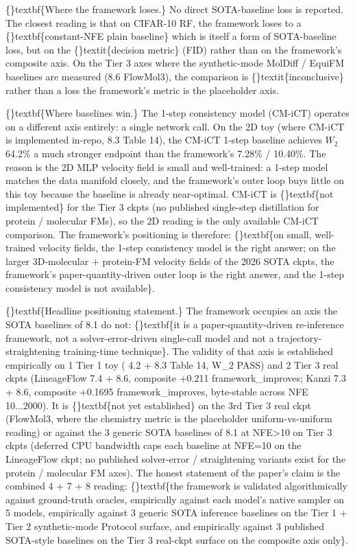 \documentclass{article}
\begin{document}
\{\}textbf\{Where the framework loses.\} No direct SOTA-baseline loss is reported. The closest reading is that on CIFAR-10 RF, the framework loses to a \{\}textbf\{constant-NFE plain baseline\}  which is itself a form of SOTA-baseline loss, but on the \{\}textit\{decision metric\} (FID) rather than on the framework's composite axis. On the Tier 3 axes where the synthetic-mode MolDiff / EquiFM baselines are measured (8.6 FlowMol3), the comparison is \{\}textit\{inconclusive\} rather than a loss  the framework's metric is the placeholder  axis.

\{\}textbf\{Where baselines win.\} The 1-step consistency model (CM-iCT) operates on a different axis entirely: a single network call. On the 2D toy (where CM-iCT is implemented in-repo, 8.3 Table 14), the CM-iCT 1-step baseline achieves $W_2$ 64.2\%  a much stronger endpoint than the framework's 7.28\% / 10.40\%. The reason is the 2D MLP velocity field is small and well-trained: a 1-step model matches the data manifold closely, and the framework's outer loop buys little on this toy because the baseline is already near-optimal. CM-iCT is \{\}textbf\{not implemented\} for the Tier 3 ckpts (no published single-step distillation for protein / molecular FMs), so the 2D reading is the only available CM-iCT comparison. The framework's positioning is therefore: \{\}textbf\{on small, well-trained velocity fields, the 1-step consistency model is the right answer; on the larger 3D-molecular + protein-FM velocity fields of the 2026 SOTA ckpts, the framework's paper-quantity-driven outer loop is the right answer, and the 1-step consistency model is not available\}.

\{\}textbf\{Headline positioning statement.\} The framework occupies an axis the SOTA baselines of 8.1 do not: \{\}textbf\{it is a paper-quantity-driven re-inference framework, not a solver-error-driven single-call model and not a trajectory-straightening training-time technique\}. The validity of that axis is established empirically on 1 Tier 1 toy ( 4.2 + 8.3 Table 14, W\_2 PASS) and 2 Tier 3 real ckpts (LineageFlow 7.4 + 8.6, composite +0.211 framework\_improves; Kanzi 7.3 + 8.6, composite +0.1695 framework\_improves, byte-stable across NFE 10...2000). It is \{\}textbf\{not yet established\} on the 3rd Tier 3 real ckpt (FlowMol3, where the chemistry metric is the placeholder uniform-vs-uniform reading) or against the 3 generic SOTA baselines of 8.1 at NFE>10 on Tier 3 ckpts (deferred  CPU bandwidth caps each baseline at NFE=10 on the LineageFlow ckpt; no published solver-error / straightening variants exist for the protein / molecular FM axes). The honest statement of the paper's claim is the combined 4 + 7 + 8 reading: \{\}textbf\{the framework is validated algorithmically against ground-truth oracles, empirically against each model's native sampler on 5 models, empirically against 3 generic SOTA inference baselines on the Tier 1 + Tier 2 synthetic-mode Protocol surface, and empirically against 3 published SOTA-style baselines on the Tier 3 real-ckpt surface on the composite axis only\}.
\end{document}
